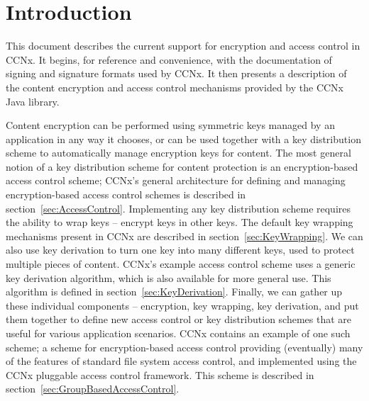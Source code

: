 


\renewcommand{\paragraph}[1]{\medskip\noindent{\bf{#1}}}
\newcommand{\ccnxpath}[1] {\medskip\noindent{\tt{#1}}}

\def \Obj {{\textbf{O}}}        %
\def \Ko {{\textbf{K}_O}}       %
\def \Kc {{\textbf{K}_c}}       %
\def \KDF {{\textbf{KDF}}}      %
\def \IV {{\textbf{IV}}}        %
\def \PRF {{\textbf{PRF}}}      %
\def \G {{\textbf{G}}}          %
\def \N {{\textbf{N}}}          %
\def \DK {{\textbf{DK}}}        %
\def \NK {{\textbf{NK}}}        %
\def \GPK {{\textbf{GPK}}}      %
\def \GSK {{\textbf{GSK}}}      %
\def \UPK {{\textbf{UPK}}}      %
\def \USK {{\textbf{USK}}}      %
\def \PK {{\textbf{PK}}}      %

\section{Introduction}
\label{sec:introduction}

This document describes the current support for encryption and access
control in CCNx.  It begins, for reference and convenience, with the
documentation of signing and signature formats used by CCNx.
It then presents a description of the content encryption and access control
mechanisms provided by the CCNx Java library.

Content encryption can be performed using symmetric keys managed by an
application in any way it chooses, or can be used together with a key
distribution scheme to automatically manage encryption keys for
content. The most general notion of a key distribution scheme for
content protection is an encryption-based access control scheme;
CCNx's general architecture for defining and managing encryption-based
access control schemes is described in
section~\ref{sec:AccessControl}. Implementing any key distribution
scheme requires the ability to wrap keys -- encrypt keys in other
keys. The default key wrapping mechanisms present in CCNx are
described in section~\ref{sec:KeyWrapping}. We can also use key
derivation to turn one key into many different keys, used to protect
multiple pieces of content.  CCNx's example access control scheme uses
a generic key derivation algorithm, which is also available for more
general use. This algorithm is defined in
section~\ref{sec:KeyDerivation}. Finally, we can gather up these
individual components -- encryption, key wrapping, key derivation, and
put them together to define new access control or key distribution
schemes that are useful for various application scenarios. CCNx
contains an example of one such scheme; a scheme for encryption-based
access control providing (eventually) many of the features of standard
file system access control, and implemented using the CCNx pluggable
access control framework. This scheme is described in
section~\ref{sec:GroupBasedAccessControl}.

